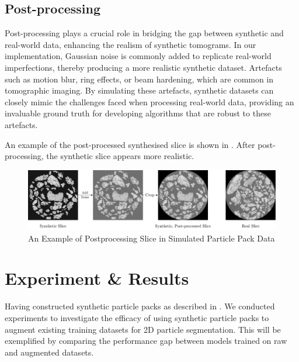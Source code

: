 \documentclass[preprint,12pt]{elsarticle}
\begin{document}
\subsection{Post-processing}
Post-processing plays a crucial role in bridging the gap between synthetic and real-world data, enhancing the realism of synthetic tomograms. 
In our implementation, Gaussian noise is commonly added to replicate real-world imperfections, thereby producing a more realistic synthetic dataset.
Artefacts such as motion blur, ring effects, or beam hardening, which are common in tomographic imaging. 
By simulating these artefacts, synthetic datasets can closely mimic the challenges faced when processing real-world data, providing an invaluable ground truth for developing algorithms that are robust to these artefacts.
\par
An example of the post-processed synthesised slice is shown in . 
After post-processing, the synthetic slice appears more realistic.
\begin{figure}[H]
    \includegraphics[width=\textwidth]{figures/pdf/postprocess.pdf}
    \caption{An Example of Postprocessing Slice in Simulated Particle Pack Data}
    \label{fig:syn:postprocess}
\end{figure}

\section{Experiment \& Results}
Having constructed synthetic particle packs as described in . 
We conducted experiments to investigate the efficacy of using synthetic particle packs to augment existing training datasets for 2D particle segmentation.
This will be exemplified by comparing the performance gap between models trained on raw and augmented datasets.
\end{document}
